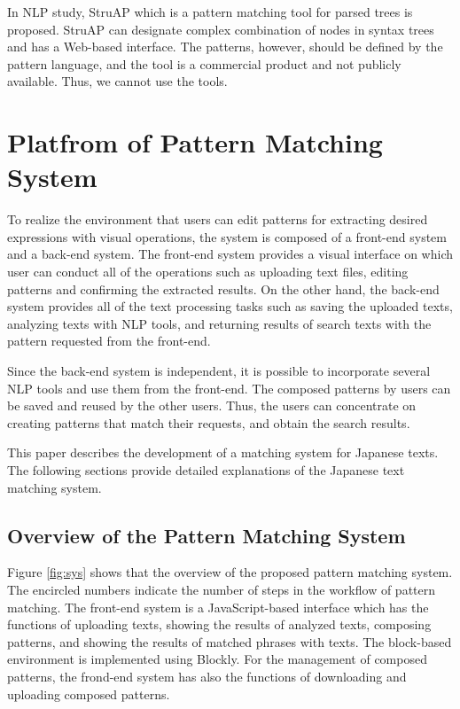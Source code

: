 \documentclass[conference]{IEEEtran}
\begin{document}
In NLP study, StruAP\cite{yanai2017} which is a pattern matching tool for parsed trees is proposed.
StruAP can designate complex combination of nodes in syntax trees and has a Web-based interface. 
The patterns, however, should be defined by the pattern language,
and the tool is a commercial product and not publicly available. 
Thus, we cannot use the tools. 


\section{Platfrom of Pattern Matching System}
To realize the environment that users can edit patterns for extracting desired expressions
with visual operations, the system is composed of a front-end system and a back-end system. 
The front-end system provides a visual interface on which user can conduct all of the operations
such as uploading text files, editing patterns and confirming the extracted results. 
On the other hand, the back-end system provides all of the text processing tasks such as
saving the uploaded texts, analyzing texts with NLP tools, and returning results of search texts
with the pattern requested from the front-end. 

Since the back-end system is independent, it is possible to incorporate several NLP tools
and use them from the front-end. The composed patterns by users can be saved and reused by
the other users. Thus, the users can concentrate on creating patterns that match their requests,
and obtain the search results. 


This paper describes the development of a matching system for Japanese texts.
The following sections provide detailed explanations of the Japanese text matching system.



\subsection{Overview of the Pattern Matching System} %
Figure \ref{fig:sys} shows that the overview of the proposed pattern matching system.
The encircled numbers indicate the number of steps in the workflow of pattern matching.
The front-end system is a JavaScript-based interface which has the functions of
uploading texts, showing the results of analyzed texts, composing patterns, and showing the results of
matched phrases with texts. The block-based environment is implemented using Blockly.
For the management of composed patterns, the frond-end system has also
the functions of downloading and uploading composed patterns. 
\end{document}
